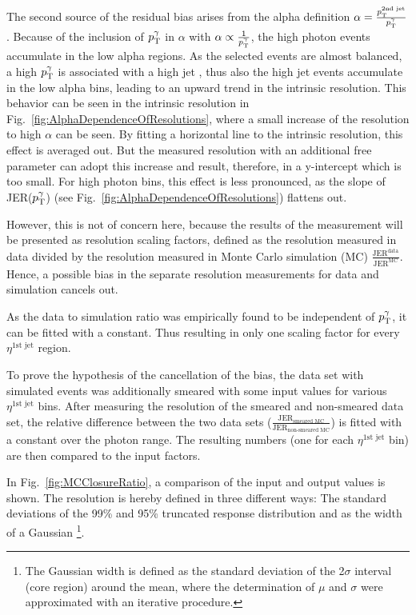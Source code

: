 The second source of the residual bias arises from the alpha definition $\alpha = \frac{p_{\text{T}}^{\text{2nd jet}}}{p_{\text{T}}^{\gamma}}$. 
Because of the inclusion of $p_{\text{T}}^{\gamma}$ in $\alpha$ with $\alpha \propto \frac{1}{p_{\text{T}}^{\gamma}}$, 
the high photon \pt events accumulate in the low alpha regions. 
As the selected events are almost balanced, a high $p_{\text{T}}^{\gamma}$ is associated with a high jet \pt, thus also the high jet \pt events accumulate in the low alpha bins, 
leading to  an upward trend in the intrinsic resolution. This behavior can be seen in the intrinsic resolution 
in Fig.~\ref{fig:AlphaDependenceOfResolutions}, where a small increase of the resolution to high $\alpha$ can be seen. 
By fitting a horizontal line to the intrinsic resolution, this effect is averaged out. 
But the measured resolution with an additional free parameter 
can adopt this increase and result, therefore, in a y-intercept which is too small. 
For high photon \pt bins, this effect is less pronounced, as the slope of JER($p_{\text{T}}^{\gamma}$) (see Fig.~\ref{fig:AlphaDependenceOfResolutions}) flattens out.

However, this is not of concern here, because the results of the measurement will be presented as resolution scaling factors, defined as the resolution measured in data divided by
the resolution measured in Monte Carlo simulation (MC) $\frac{\text{JER}^{\text{data}}}{\text{JER}^{\text{MC}}}$. 
Hence, a possible bias in the separate resolution measurements for data and simulation cancels out. 

As the data to simulation ratio was empirically found to be independent of $p_{\text{T}}^{\gamma}$, it can be fitted with a constant.
Thus resulting in only one scaling factor for every $\eta^{\text{1st jet}}$ region.


To prove the hypothesis of the cancellation of the bias, the data set with simulated 
events was additionally smeared with some input values for various $\eta^{\text{1st jet}}$ bins. 
After measuring the resolution of the smeared and non-smeared data set, the relative difference between the two data sets  
($\frac{\text{JER}_{\text{smeared MC}}}{\text{JER}_{\text{non-smeared MC}}}$) is fitted with a constant over the photon \pt range. 
The resulting numbers (one for each $\eta^{\text{1st jet}}$ bin) are then compared to the input factors. 

In \mbox{Fig. \ref{fig:MCClosureRatio}}, a comparison of the input and output values is shown. The resolution is hereby defined in three different ways: 
The standard deviations of the 99\% and 95\% truncated response distribution and as the width of a Gaussian 
\footnote{The Gaussian width is defined as the standard deviation of the 2$\sigma$ interval (core region) around the mean, where the determination of $\mu$ and $\sigma$ were approximated with an iterative procedure.}.

